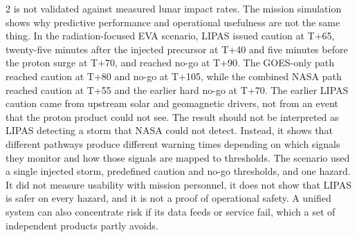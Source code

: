 \begin{multicols}{2}
is not validated against measured lunar impact rates. The mission simulation shows why predictive performance and operational usefulness are not the same thing. In the radiation-focused EVA scenario, LIPAS issued caution at T+65, twenty-five minutes after the injected precursor at T+40 and five minutes before the proton surge at T+70, and reached no-go at T+90. The GOES-only path reached caution at T+80 and no-go at T+105, while the combined NASA path reached caution at T+55 and the earlier hard no-go at T+70. The earlier LIPAS caution came from upstream solar and geomagnetic drivers, not from an event that the proton product could not see. The result should not be interpreted as LIPAS detecting a storm that NASA could not detect. Instead, it shows that different pathways produce different warning times depending on which signals they monitor and how those signals are mapped to thresholds. The scenario used a single injected storm, predefined caution and no-go thresholds, and one hazard. It did not measure usability with mission personnel, it does not show that LIPAS is safer on every hazard, and it is not a proof of operational safety. A unified system can also concentrate risk if its data feeds or service fail, which a set of independent products partly avoids.


\end{multicols}
